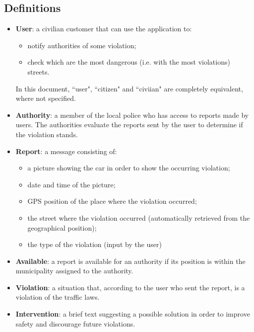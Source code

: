 \documentclass[12pt,a4paper]{report}
\begin{document}
			\subsection{Definitions}
				\begin{itemize}
				\item \textbf{User}: a civilian customer that can use the application to:
					\begin{itemize}
					\item notify authorities of some violation;
					\item check which are the most dangerous (i.e. with the most violations) streets.
					\end{itemize}
				In this document, ``user", ``citizen" and ``civiian" are completely equivalent, where not specified.
				\item \textbf{Authority}: a member of the local police who has access to reports made by users. The
					authorities evaluate the reports sent by the user to determine if the violation stands.
				\item \textbf{Report}: a message consisting of:
					\begin{itemize}
					\item a picture showing the car in order to show the occurring violation;
					\item date and time of the picture;
					\item GPS position of the place where the violation occurred;
					\item the street where the violation occurred (automatically retrieved from the geographical position);
					\item the type of the violation (input by the user)
					\end{itemize}
				\item \textbf{Available}: a report is available for an authority if its position is within the municipality assigned
					to the authority.
				\item \textbf{Violation}: a situation that, according to the user who sent the report, is a violation of the
					traffic laws.
				\item \textbf{Intervention}: a brief text suggesting a possible solution in order to improve safety and
					discourage future violations.
				\end{itemize}
\end{document}
